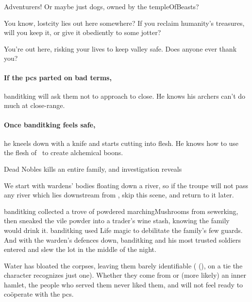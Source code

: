 \begin{speechtext}
  Adventurers!
  Or maybe just dogs, owned by the \gls{templeOfBeasts}?

  You know, \gls{lostcity} lies out here somewhere?
  If you reclaim humanity's treasures, will you keep it, or give it obediently to some \gls{jotter}?

  You're out here, risking your lives to keep \gls{valley} safe.
  Does anyone ever thank you?
\end{speechtext}

\paragraph{If the \glspl{pc} parted on bad terms,}
\gls{banditking} will ask them not to approach to close.
He knows his archers can't do much at close-range.

\paragraph{Once \gls{banditking} feels safe,}
he kneels down with a knife and starts cutting into flesh.
He knows how to use the flesh of \localMonster\ to create alchemical \glspl{boon}.

{Dead Nobles}%
{ kills an entire  family, and investigation reveals }%

We start with \glspl{warden}' bodies floating down a river, so if the troupe will not pass any river which lies downstream from , skip this scene, and return to it later.

\begin{exampletext}
  \Gls{banditking} collected a trove of powdered \glspl{marchingMushroom} from \gls{sewerking}, then sneaked the vile powder into a trader's wine stash, knowing the family would drink it.
  \Gls{banditking} used Life magic to debilitate the family's few guards.
  And with the \gls{warden}'s defences down, \gls{banditking} and his most trusted soldiers entered and slew the lot in the middle of the night.
\end{exampletext}

Water has bloated the corpses, leaving them barely identifiable ( (\tn[11]), on a tie the character recognizes just one).
Whether they come from  or (more likely) an inner hamlet, the people who served them never liked them, and will not feel ready to co\"operate with the \glspl{pc}.

